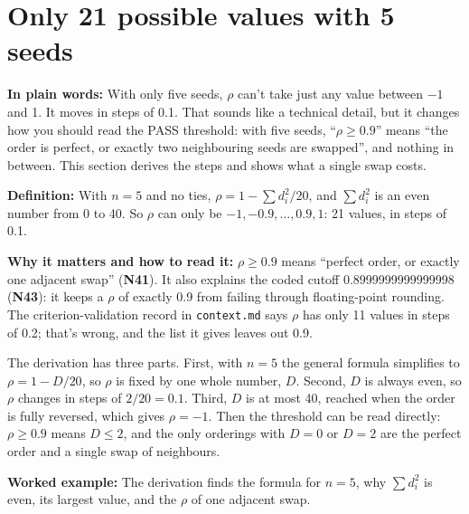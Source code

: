 \documentclass[11pt,a4paper,oneside,openany]{report}
\newcommand{\code}[1]{\texttt{#1}}
\newcommand{\gl}[1]{\textbf{#1}}   %
\newcommand{\fplain}{\textbf{In plain words:} }
\newcommand{\fdef}{\textbf{Definition:} }
\newcommand{\fread}{\par\textbf{Why it matters and how to read it:} }
\newcommand{\fex}{\par\textbf{Worked example:} }
\begin{document}
\section{Only 21 possible values with 5 seeds}
\fplain With only five seeds, $\rho$ can't take just any value between $-1$ and 1. It moves in steps of 0.1. That sounds like a technical detail, but it changes how you should read the PASS threshold: with five seeds, ``$\rho \ge 0.9$'' means ``the order is perfect, or exactly two neighbouring seeds are swapped'', and nothing in between. This section derives the steps and shows what a single swap costs.

\fdef With $n = 5$ and no ties, $\rho = 1 - \sum d_i^2 / 20$, and $\sum d_i^2$ is an even number from 0 to 40. So $\rho$ can only be $-1, -0.9, \ldots, 0.9, 1$: 21 values, in steps of 0.1.
\fread $\rho \ge 0.9$ means ``perfect order, or exactly one adjacent swap'' (\gl{N41}). It also explains the coded cutoff 0.8999999999999998 (\gl{N43}): it keeps a $\rho$ of exactly 0.9 from failing through floating-point rounding. The criterion-validation record in \code{context.md} says $\rho$ has only 11 values in steps of 0.2; that's wrong, and the list it gives leaves out 0.9.

The derivation has three parts. First, with $n = 5$ the general formula simplifies to $\rho = 1 - D/20$, so $\rho$ is fixed by one whole number, $D$. Second, $D$ is always even, so $\rho$ changes in steps of $2/20 = 0.1$. Third, $D$ is at most 40, reached when the order is fully reversed, which gives $\rho = -1$. Then the threshold can be read directly: $\rho \ge 0.9$ means $D \le 2$, and the only orderings with $D = 0$ or $D = 2$ are the perfect order and a single swap of neighbours.

\fex The derivation finds the formula for $n = 5$, why $\sum d_i^2$ is even, its largest value, and the $\rho$ of one adjacent swap.
\end{document}
